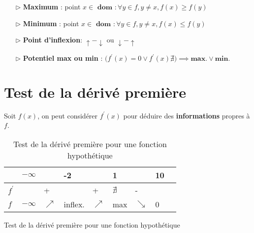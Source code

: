 \documentclass{report}
\begin{document}
\begin{multicols*}{3}
    \begin{itemize}
        \item[$\rhd$]  \textbf{Maximum} : point $x \in \textbf{ dom } : 
            \forall y \in f, y \neq x, f(x) \geq f(y)$     
        \item[$\rhd$]  \textbf{Minimum} : point $x \in \textbf{ dom } : 
            \forall y \in f, y \neq x, f(x) \leq f(y)$    
        \item[$\rhd$]  \textbf{Point d'inflexion}: $\uparrow - \downarrow$ 
            ou $\downarrow - \uparrow$
        \item[$\rhd$]  \textbf{Potentiel max ou min} :   
        $\bigl( f^{\prime} \left( x \right) = 0 \lor f^{\prime} \left(x\right) \nexists \bigr) \implies \textbf{max}. \lor \textbf{min}.     $
    \end{itemize}

    \section{Test de la dérivé première}
    Soit $f(x)$, on peut considérer $f^{\prime}(x)$ 
    pour déduire des \textbf{informations} propres à $f$.   

    \begin{table}[H]
    \centering

      \caption {Test de la dérivé première pour une fonction hypothétique}

    \begin{adjustbox}{width=0.33\textwidth}
        \renewcommand{\arraystretch}{1.5}
        \selectfont
        \begin{tabular}{|l|l|l|l|l|l|l|l|l}
        \arrayrulecolor{blue}\hline
        \rowcolor{lightBlue}
        \textcolor{myb}{} & \textcolor{myb}{ $-\infty$ } & & -2 & & 1 & & 10
        \\
        \hline
        \hline
        \arrayrulecolor{black} 
        $f^{\prime} $ &  & + &  & + & $\nexists$  & - & 
        \\ 
        \hline 
        $f$ & $-\infty$  & $\nearrow$ & inflex. & 
        $\nearrow$ & max & $\searrow$ & 0 
        \\ 
        \hline
      \end{tabular}
    \end{adjustbox}
    \end{table}
    

    \begin{table}[h]
      \caption {Test de la dérivé première pour une fonction hypothétique}


\end{table}
\end{multicols*}
\end{document}
